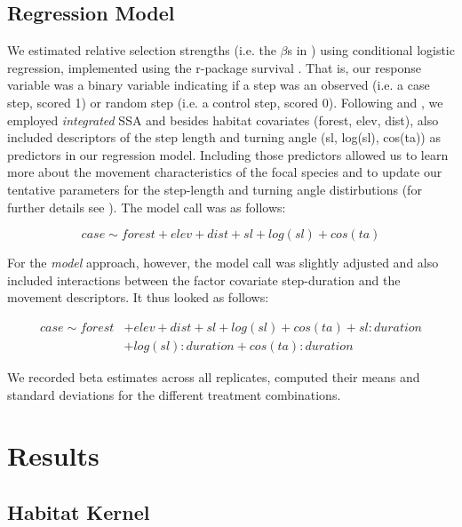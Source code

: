 \documentclass[abstract=on,10pt,a4paper,bibliography=totocnumbered]{article}
\begin{document}
\subsection{Regression Model}
\label{RegressionModel}
We estimated relative selection strengths (i.e. the \(\beta\)s in )
using conditional logistic regression, implemented using the r-package
\textsf{survival} \citep{Therneau.2021}. That is, our response variable was a
binary variable indicating if a step was an observed (i.e. a case step, scored
1) or random step (i.e. a control step, scored 0). Following \cite{Avgar.2016}
and \cite{Fieberg.2021}, we employed \textit{integrated} SSA and besides habitat
covariates (\textsf{forest, elev, dist}), also included descriptors of the step
length and turning angle (\textsf{sl, log(sl), cos(ta)}) as predictors in our
regression model. Including those predictors allowed us to learn more about the
movement characteristics of the focal species and to update our tentative
parameters for the step-length and turning angle distirbutions (for further
details see \citealp{Fieberg.2021}). The model call was as follows:

$$
case \sim forest + elev + dist + sl + log(sl) + cos(ta)
$$

For the \textit{model} approach, however, the model call was slightly adjusted
and also included interactions between the factor covariate step-duration and
the movement descriptors. It thus looked as follows:

\begin{align*}
case \sim forest &+ elev + dist + sl + log(sl) + cos(ta) + sl:duration \\
  &+ log(sl):duration + cos(ta):duration
\end{align*}

We recorded beta estimates across all replicates, computed their means and
standard deviations for the different treatment combinations.

\section{Results}
\subsection{Habitat Kernel}
\end{document}
